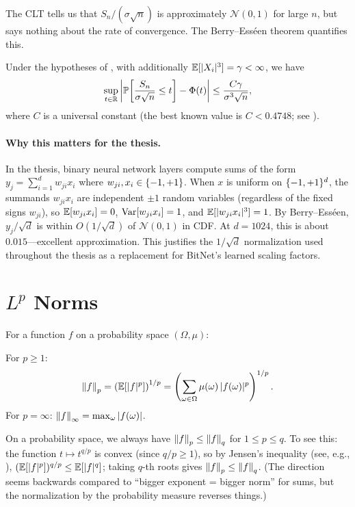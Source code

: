 The CLT tells us that $S_n / (\sigma \sqrt{n})$ is approximately
$\mathcal{N}(0,1)$ for large $n$, but says nothing about the rate of
convergence. The Berry--Ess\'een theorem quantifies this.

\begin{theorem}\label{thm:berry-esseen}
Under the hypotheses of , with additionally
$\mathbb{E}[|X_i|^3] = \gamma < \infty$, we have
\[
  \sup_{t \in \mathbb{R}}
  \left|
    \mathbb{P}\!\left[\frac{S_n}{\sigma\sqrt{n}} \leq t\right]
    - \Phi(t)
  \right|
  \leq \frac{C \gamma}{\sigma^3 \sqrt{n}},
\]
where $C$ is a universal constant (the best known value is $C < 0.4748$;
see \citealp{shevtsova2011absolute}).
\end{theorem}

\paragraph{Why this matters for the thesis.}
In the thesis, binary neural network layers compute sums of the form
$y_j = \sum_{i=1}^d w_{ji} x_i$ where $w_{ji}, x_i \in \{-1,+1\}$.
When $x$ is uniform on $\{-1,+1\}^d$, the summands $w_{ji} x_i$ are
independent $\pm 1$ random variables (regardless of the fixed signs
$w_{ji}$), so $\mathbb{E}[w_{ji} x_i] = 0$, $\operatorname{Var}[w_{ji} x_i] = 1$, and
$\mathbb{E}[|w_{ji} x_i|^3] = 1$. By Berry--Ess\'een,
$y_j / \sqrt{d}$ is within $O(1/\sqrt{d})$ of $\mathcal{N}(0,1)$ in CDF.
At $d = 1024$, this is about $0.015$---excellent approximation.
This justifies the $1/\sqrt{d}$ normalization used throughout the thesis
as a replacement for BitNet's learned scaling factors.


\section{$L^p$ Norms}\label{sec:lp-norms}

For a function $f$ on a probability space $(\Omega, \mu)$:

\begin{definition}[$L^p$ norm]\label{def:lp}
For $p \geq 1$:
\[
  \left\| f \right\|_p = \left(\mathbb{E}\!\left[|f|^p\right]\right)^{1/p}
  = \left(\sum_{\omega \in \Omega} \mu(\omega)\, |f(\omega)|^p\right)^{1/p}.
\]
For $p = \infty$: $\left\| f \right\|_\infty = \max_\omega |f(\omega)|$.
\end{definition}

On a probability space, we always have $\left\| f \right\|_p \leq \left\| f \right\|_q$ for
$1 \leq p \leq q$. To see this: the function $t \mapsto t^{q/p}$ is
convex (since $q/p \geq 1$), so by Jensen's inequality
(see, e.g., \citealp[Theorem~1.6.2]{durrett2019probability}),
$(\mathbb{E}[|f|^p])^{q/p} \leq \mathbb{E}[|f|^q]$; taking $q$-th roots gives
$\left\| f \right\|_p \leq \left\| f \right\|_q$. (The direction seems backwards compared
to ``bigger exponent = bigger norm'' for sums, but the normalization by
the probability measure reverses things.)

